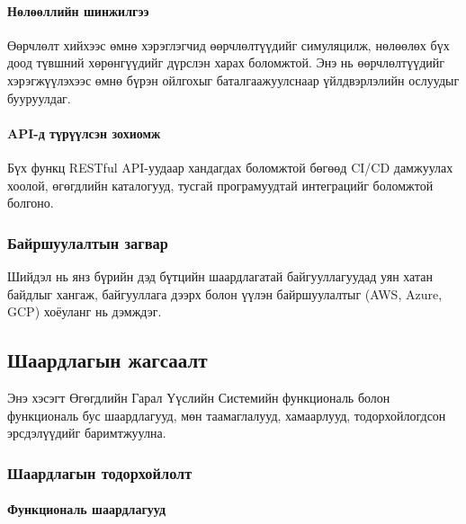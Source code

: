 \paragraph{Нөлөөллийн шинжилгээ}
Өөрчлөлт хийхээс өмнө хэрэглэгчид өөрчлөлтүүдийг симуляцилж, нөлөөлөх бүх доод түвшний хөрөнгүүдийг дүрслэн харах боломжтой. Энэ нь өөрчлөлтүүдийг хэрэгжүүлэхээс өмнө бүрэн ойлгохыг баталгаажуулснаар үйлдвэрлэлийн ослуудыг бууруулдаг.

\paragraph{API-д түрүүлсэн зохиомж}
Бүх функц RESTful API-уудаар хандагдах боломжтой бөгөөд CI/CD дамжуулах хоолой, өгөгдлийн каталогууд, тусгай програмуудтай интеграцийг боломжтой болгоно.

\subsubsection{Байршуулалтын загвар}

Шийдэл нь янз бүрийн дэд бүтцийн шаардлагатай байгууллагуудад уян хатан байдлыг хангаж, байгууллага дээрх болон үүлэн байршуулалтыг (AWS, Azure, GCP) хоёуланг нь дэмждэг.

\subsection{Шаардлагын жагсаалт}
\label{subsec:dl_requirements}

Энэ хэсэгт Өгөгдлийн Гарал Үүслийн Системийн функциональ болон функциональ бус шаардлагууд, мөн таамаглалууд, хамаарлууд, тодорхойлогдсон эрсдэлүүдийг баримтжуулна.

\subsubsection{Шаардлагын тодорхойлолт}

\paragraph{Функциональ шаардлагууд}

